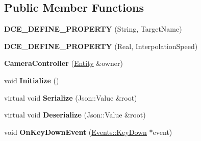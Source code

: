 \subsection*{Public Member Functions}
\begin{DoxyCompactItemize}
\item 
\hypertarget{classDCEngine_1_1Components_1_1CameraController_aa5cf9a4a9100bd552f5d06ae88580552}{{\bfseries D\-C\-E\-\_\-\-D\-E\-F\-I\-N\-E\-\_\-\-P\-R\-O\-P\-E\-R\-T\-Y} (String, Target\-Name)}\label{classDCEngine_1_1Components_1_1CameraController_aa5cf9a4a9100bd552f5d06ae88580552}

\item 
\hypertarget{classDCEngine_1_1Components_1_1CameraController_ac5b7383968adc711f02c972920a6e67b}{{\bfseries D\-C\-E\-\_\-\-D\-E\-F\-I\-N\-E\-\_\-\-P\-R\-O\-P\-E\-R\-T\-Y} (Real, Interpolation\-Speed)}\label{classDCEngine_1_1Components_1_1CameraController_ac5b7383968adc711f02c972920a6e67b}

\item 
\hypertarget{classDCEngine_1_1Components_1_1CameraController_a2ca2a5946e5652b44426b1a92284bef2}{{\bfseries Camera\-Controller} (\hyperlink{classDCEngine_1_1Entity}{Entity} \&owner)}\label{classDCEngine_1_1Components_1_1CameraController_a2ca2a5946e5652b44426b1a92284bef2}

\item 
\hypertarget{classDCEngine_1_1Components_1_1CameraController_ac874899f88de6d8516f9e5554270282f}{void {\bfseries Initialize} ()}\label{classDCEngine_1_1Components_1_1CameraController_ac874899f88de6d8516f9e5554270282f}

\item 
\hypertarget{classDCEngine_1_1Components_1_1CameraController_a4ed1fa10e835f7596cb10d361a4dad27}{virtual void {\bfseries Serialize} (Json\-::\-Value \&root)}\label{classDCEngine_1_1Components_1_1CameraController_a4ed1fa10e835f7596cb10d361a4dad27}

\item 
\hypertarget{classDCEngine_1_1Components_1_1CameraController_a3dac551a7dc7e5eb151c896a5cfeb393}{virtual void {\bfseries Deserialize} (Json\-::\-Value \&root)}\label{classDCEngine_1_1Components_1_1CameraController_a3dac551a7dc7e5eb151c896a5cfeb393}

\item 
\hypertarget{classDCEngine_1_1Components_1_1CameraController_aa69a7456ca7f79c08f7e4da9e22ac006}{void {\bfseries On\-Key\-Down\-Event} (\hyperlink{classDCEngine_1_1Events_1_1KeyDown}{Events\-::\-Key\-Down} $\ast$event)}\label{classDCEngine_1_1Components_1_1CameraController_aa69a7456ca7f79c08f7e4da9e22ac006}


\end{DoxyCompactItemize}
